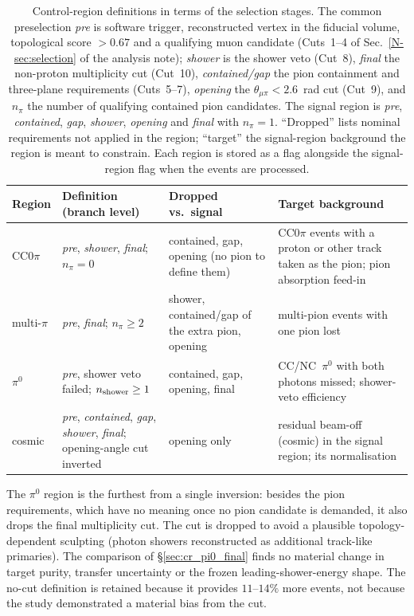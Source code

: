 \documentclass[11pt,a4paper]{article}
\newcommand{\noteref}[2]{#1~\ref{N-#2} of the analysis note}
\begin{document}
\begin{table}[H]
  \centering
  \caption{Control-region definitions in terms of the selection stages. The
    common preselection \textit{pre} is software trigger, reconstructed vertex in the
    fiducial volume, topological score $>0.67$ and a qualifying muon candidate
    (Cuts~1--4 of \noteref{Sec.}{sec:selection}); \textit{shower} is the shower veto (Cut~8),
    \textit{final} the non-proton multiplicity cut (Cut~10), \textit{contained/gap} the
    pion containment and three-plane requirements (Cuts~5--7), \textit{opening} the
    $\theta_{\mu\pi}<2.6$~rad cut (Cut~9), and $n_\pi$ the number of qualifying contained
    pion candidates. The signal region is \textit{pre}, \textit{contained}, \textit{gap}, \textit{shower},
    \textit{opening} and \textit{final} with $n_\pi=1$. ``Dropped'' lists nominal requirements not
    applied in the region; ``target'' the signal-region background the region is meant to
    constrain. Each region is stored as a flag alongside the signal-region flag when the
    events are processed.}
  \label{tab:cr_defs}
  \small
  \begin{tabular}{p{1.5cm}p{5.2cm}p{3.0cm}p{4.6cm}}
    \toprule
    Region & Definition (branch level) & Dropped vs.\ signal & Target background \\
    \midrule
    CC$0\pi$ & \textit{pre}, \textit{shower}, \textit{final}; $n_\pi=0$ & contained, gap, opening (no pion to define them) & CC$0\pi$ events with a proton or other track taken as the pion; pion absorption feed-in \\
    multi-$\pi$ & \textit{pre}, \textit{final}; $n_\pi\ge2$ & shower, contained/gap of the extra pion, opening & multi-pion events with one pion lost \\
    $\pi^0$ & \textit{pre}, shower veto failed; $n_{\rm shower}\ge1$ & contained, gap, opening, final & CC/NC~$\pi^0$ with both photons missed; shower-veto efficiency \\
    cosmic & \textit{pre}, \textit{contained}, \textit{gap}, \textit{shower}, \textit{final}; opening-angle cut inverted & opening only & residual beam-off (cosmic) in the signal region; its normalisation \\
    \bottomrule
  \end{tabular}
\end{table}

\noindent The $\pi^0$ region is the furthest from a single inversion: besides the pion
requirements, which have no meaning once no pion candidate is demanded, it also drops the
final multiplicity cut. The cut is dropped to avoid a plausible topology-dependent
sculpting (photon showers reconstructed as additional track-like primaries). The
comparison of \S\ref{sec:cr_pi0_final} finds no material change in target purity, transfer uncertainty or the frozen
leading-shower-energy shape. The no-cut definition is retained because it provides
$11$--$14\%$ more events, not because the study demonstrated a material bias from the
cut.
\end{document}
